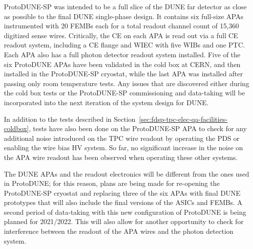 ProtoDUNE-SP was intended to be a full slice of the DUNE far detector as close as possible to the final DUNE single-phase design. It contains six full-size APAs instrumented with 20 FEMBs each for a total readout channel count of 15,360 digitized sense wires. Critically, the CE on each APA is read out via a full CE readout system, including a CE flange and WIEC with five WIBs and one PTC. Each APA also has a full photon detector readout system installed. Five of the six ProtoDUNE APAs have been validated in the cold box at CERN, and then installed in the ProtoDUNE-SP cryostat, while the last APA was installed after passing only room temperature tests. Any issues that are discovered either during the cold box tests or the ProtoDUNE-SP commissioning and data-taking will be incorporated into the next iteration of the system design for DUNE.

In addition to the tests described in Section~\ref{sec:fdsp-tpc-elec-qa-facilities-coldbox}, tests have also been done on the ProtoDUNE-SP APA to check for any additional noise introduced on the TPC wire readout by operating the PDS or enabling the wire bias HV system. So far, no significant increase in the noise on the APA wire readout has been observed when operating these other systems.

The DUNE APAs and the readout electronics will be different from the ones used in ProtoDUNE; for this reason, plans are being made for re-opening the ProtoDUNE-SP cryostat and replacing three of the six APAs with final DUNE prototypes that will also include the final versions of the ASICs and FEMBs. A second period of data-taking with this new configuration of ProtoDUNE is being planned for 2021/2022. This will also allow for another opportunity to check for interference between the readout of the APA wires and the photon detection system.
